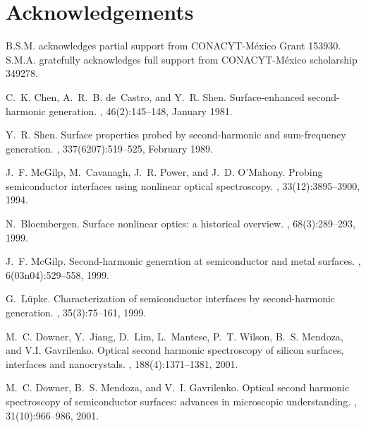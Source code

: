 \documentclass[aps,prb,10pt,showpacs,letterpaper,twocolumn]{revtex4-1}
\begin{document}


\section{Acknowledgements}\label{sec:acknowledgements}

B.S.M. acknowledges partial support from CONACYT-M\'exico Grant 153930. S.M.A.
gratefully acknowledges full support from CONACYT-M\'exico scholarship 349278.



\begin{thebibliography}{10}

C.~K. Chen, A.~R.~B. de~Castro, and Y.~R. Shen.
\newblock Surface-enhanced second-harmonic generation.
, 46(2):145--148, January 1981.

Y.~R. Shen.
\newblock Surface properties probed by second-harmonic and sum-frequency
  generation.
, 337(6207):519--525, February 1989.

J.~F. McGilp, M.~Cavanagh, J.~R. Power, and J.~D. O'Mahony.
\newblock Probing semiconductor interfaces using nonlinear optical
  spectroscopy.
, 33(12):3895--3900, 1994.

N.~Bloembergen.
\newblock Surface nonlinear optics: a historical overview.
, 68(3):289--293, 1999.

J.~F. McGilp.
\newblock Second-harmonic generation at semiconductor and metal surfaces.
, 6(03n04):529--558, 1999.

G.~L{\"u}pke.
\newblock Characterization of semiconductor interfaces by second-harmonic
  generation.
, 35(3):75--161, 1999.

M.~C. Downer, Y.~Jiang, D.~Lim, L.~Mantese, P.~T. Wilson, B.~S. Mendoza, and
  V.I. Gavrilenko.
\newblock Optical second harmonic spectroscopy of silicon surfaces, interfaces
  and nanocrystals.
, 188(4):1371--1381, 2001.

M.~C. Downer, B.~S. Mendoza, and V.~I. Gavrilenko.
\newblock Optical second harmonic spectroscopy of semiconductor surfaces:
  advances in microscopic understanding.
, 31(10):966--986, 2001.


\end{thebibliography}
\end{document}
